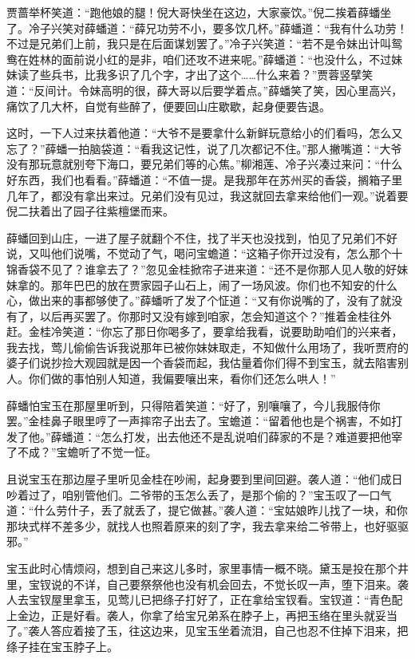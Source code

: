 \documentclass[12pt,oneside]{book}
\begin{document}
贾蔷举杯笑道：“跑他娘的腿！倪大哥快坐在这边，大家豪饮。”倪二挨着薛蟠坐了。冷子兴笑对薛蟠道：“薛兄功劳不小，要多饮几杯。”薛蟠道：“我有什么功劳！不过是兄弟们上前，我只是在后面谋划罢了。”冷子兴笑道：“若不是令妹出计叫鸳鸯在姓林的面前说小红的是非，咱们还攻不进来呢。”薛蟠道：“也没什么，不过妹妹读了些兵书，比我多识了几个字，才出了这个……什么来着？”贾蓉竖擘笑道：“反间计。令妹高明的很，薛大哥以后要学着点。”薛蟠笑了笑，因心里高兴，痛饮了几大杯，自觉有些醉了，便要回山庄歇歇，起身便要告退。

这时，一下人过来扶着他道：“大爷不是要拿什么新鲜玩意给小的们看吗，怎么又忘了？”薛蟠一拍脑袋道：“看我这记性，说了几次都记不住。”那人撇嘴道：“大爷没有那玩意就别夸下海口，要兄弟们等的心焦。”柳湘莲、冷子兴凑过来问：“什么好东西，我们也看看。”薛蟠道：“不值一提。是我那年在苏州买的香袋，搁箱子里几年了，都没有拿出来过。兄弟们没有见过，我这就回去拿来给他们一观。”说着要倪二扶着出了园子往紫檀堡而来。

薛蟠回到山庄，一进了屋子就翻个不住，找了半天也没找到，怕见了兄弟们不好说，又叫他们说嘴，不觉动了气，喝问宝蟾道：“这箱子你开过没有，怎么那个十锦香袋不见了？谁拿去了？”忽见金桂掀帘子进来道：“还不是你那人见人敬的好妹妹拿的。那年巴巴的放在贾家园子山石上，闹了一场风波。你们也不知安的什么心，做出来的事都够使了。”薛蟠听了发了个怔道：“又有你说嘴的了，没有了就没有了，以后再买罢了。你那时又没有嫁到咱家，怎会知道这个？”推着金桂往外赶。金桂冷笑道：“你忘了那日你喝多了，要拿给我看，说要助助咱们的兴来者，我去找，莺儿偷偷告诉我说那年已被你妹妹取走，不知做什么用场了，我听贾府的婆子们说抄捡大观园就是因一个香袋而起，我估量着你们得不到宝玉，就去陷害别人。你们做的事怕别人知道，我偏要嚷出来，看你们还怎么哄人！”

薛蟠怕宝玉在那屋里听到，只得陪着笑道：“好了，别嚷嚷了，今儿我服侍你罢。”金桂鼻子眼里哼了一声摔帘子出去了。宝蟾道：“留着他也是个祸害，不如打发了他。”薛蟠道：“怎么打发，出去他还不是乱说咱们薛家的不是？难道要把他宰了不成？”宝蟾听了不觉一怔。

且说宝玉在那边屋子里听见金桂在吵闹，起身要到里间回避。袭人道：“他们成日吵着过了，咱别管他们。二爷带的玉怎么丢了，是那个偷的？”宝玉叹了一口气道：“什么劳什子，丢了就丢了，提它做甚。”袭人道：“宝姑娘昨儿找了一块，和你那块式样不差多少，就找人也照着原来的刻了字，我去拿来给二爷带上，也好驱驱邪。”

宝玉此时心情烦闷，想到自己来这儿多时，家里事情一概不晓。黛玉是投在那个井里，宝钗说的不详，自己要祭祭他也没有机会回去，不觉长叹一声，堕下泪来。袭人去宝钗屋里拿玉，见莺儿已把绦子打好了，正在拿给宝钗看。宝钗道：“青色配上金边，正是好看。袭人，你拿了给宝兄弟系在脖子上，再把玉络在里头就妥当了。”袭人答应着接了玉，往这边来，见宝玉坐着流泪，自己也忍不住掉下泪来，把绦子挂在宝玉脖子上。
\end{document}
